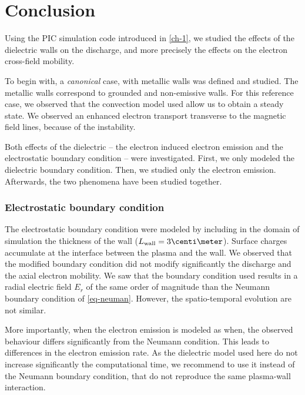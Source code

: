 
\section{Conclusion}
  \label{sec-conclusion_ch2}
  
  Using the \ac{PIC} simulation code introduced in \vref{ch-1}, we studied the effects of the dielectric walls on the discharge, and more precisely the effects on the electron cross-field mobility.
  
  To begin with, a \emph{canonical} case, with metallic walls was defined and studied.
  The metallic walls correspond to grounded and non-emissive walls.
  For this reference case, we observed that the convection model used allow us to obtain a steady state.
  We observed an enhanced electron transport transverse to the magnetic field lines, because of the instability.
  
  Both effects of the dielectric -- the electron induced electron emission and the electrostatic boundary condition -- were investigated.
  First, we  only modeled the dielectric boundary condition. Then, we studied only the electron emission. Afterwards, the two phenomena have been studied together.
  
  \subsubsection*{Electrostatic boundary condition}
  
  The electrostatic boundary condition were modeled by including in the domain of simulation the thickness of the wall ($L_{\rm wall} = 3 \centi\meter$).
  Surface charges accumulate at the interface between the plasma and the wall.
  We observed that the modified boundary condition did not modify significantly the discharge and the axial electron mobility.
  We saw that the boundary condition used results in a radial electric field $E_r$ of the same order of magnitude than the Neumann boundary condition of \vref{eq-neuman}.
  However, the spatio-temporal evolution are not similar.
  
  More importantly, when the electron emission is modeled as when, the observed behaviour differs significantly from the Neumann condition.
  This leads to differences in the electron emission rate.
  As the dielectric model used here do not increase significantly the computational time, we recommend to use it instead of the Neumann boundary condition, that do not reproduce the same plasma-wall interaction.
  
